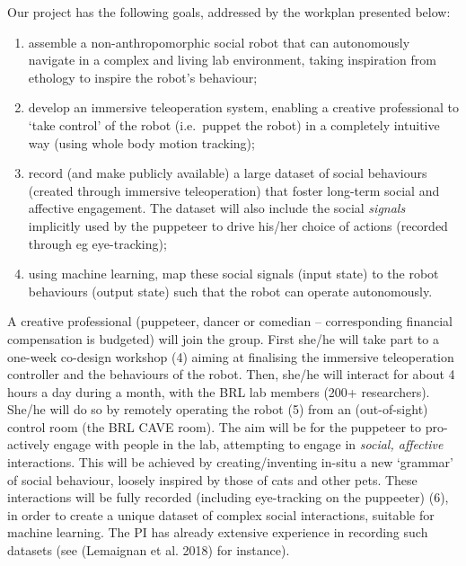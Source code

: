 \documentclass[11pt,a4paper]{report}
\begin{document}
Our project has the following goals, addressed by the workplan presented
below:

\begin{enumerate}
\def\labelenumi{\arabic{enumi}.}
\item
  assemble a non-anthropomorphic social robot that can autonomously
  navigate in a complex and living lab environment, taking inspiration
  from ethology to inspire the robot's behaviour;
\item
  develop an immersive teleoperation system, enabling a creative
  professional to `take control' of the robot (i.e.~puppet the robot) in
  a completely intuitive way (using whole body motion tracking);
\item
  record (and make publicly available) a large dataset of social
  behaviours (created through immersive teleoperation) that foster
  long-term social and affective engagement. The dataset will also
  include the social \emph{signals} implicitly used by the puppeteer to
  drive his/her choice of actions (recorded through eg eye-tracking);
\item
  using machine learning, map these social signals (input state) to the
  robot behaviours (output state) such that the robot can operate
  autonomously.
\end{enumerate}

A creative professional (puppeteer, dancer or comedian --
corresponding financial compensation is budgeted) will join the group.
First she/he will take part to a one-week co-design workshop (4) aiming
at finalising the immersive teleoperation controller and the behaviours
of the robot. Then, she/he will interact for about 4 hours a day during
a month, with the BRL lab members (200+ researchers). She/he will do so
by remotely operating the robot (5) from an (out-of-sight) control room
(the BRL CAVE room). The aim will be for the puppeteer to pro-actively
engage with people in the lab, attempting to engage in \emph{social,
affective} interactions. This will be achieved by creating/inventing
in-situ a new `grammar' of social behaviour, loosely inspired by those
of cats and other pets. These interactions will be fully recorded
(including eye-tracking on the puppeeter) (6), in order to create a
unique dataset of complex social interactions, suitable for machine
learning. The PI has already extensive experience in recording such
datasets (see (Lemaignan et al. 2018) for instance).

\end{document}
